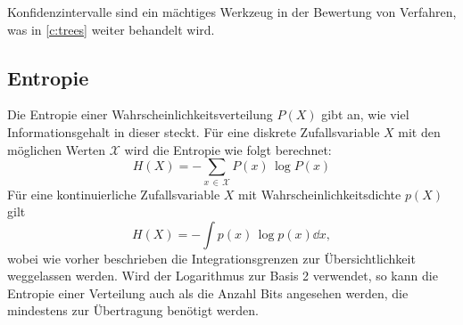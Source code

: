 			Konfidenzintervalle sind ein mächtiges Werkzeug in der Bewertung von Verfahren, was in \autoref{c:trees} weiter behandelt wird.

		\subsection{Entropie}
			Die Entropie einer Wahrscheinlichkeitsverteilung \(P(X)\) gibt an, wie viel Informationsgehalt in dieser steckt. Für eine diskrete Zufallsvariable \(X\) mit den möglichen Werten \(\mathcal{X}\) wird die Entropie wie folgt berechnet:
			\begin{equation}
				H(X) = -\!\sum_{x \,\in\, \mathcal{X}} P(x) \,\log P(x)
			\end{equation}
			Für eine kontinuierliche Zufallsvariable \(X\) mit Wahrscheinlichkeitsdichte \(p(X)\) gilt
			\begin{equation}
				H(X) = -\!\int\! p(x) \,\log p(x) \dd{x}\!,
			\end{equation}
			wobei wie vorher beschrieben die Integrationsgrenzen zur Übersichtlichkeit weggelassen werden. Wird der Logarithmus zur Basis \num{2} verwendet, so kann die Entropie einer Verteilung auch als die Anzahl Bits angesehen werden, die mindestens zur Übertragung benötigt werden.

